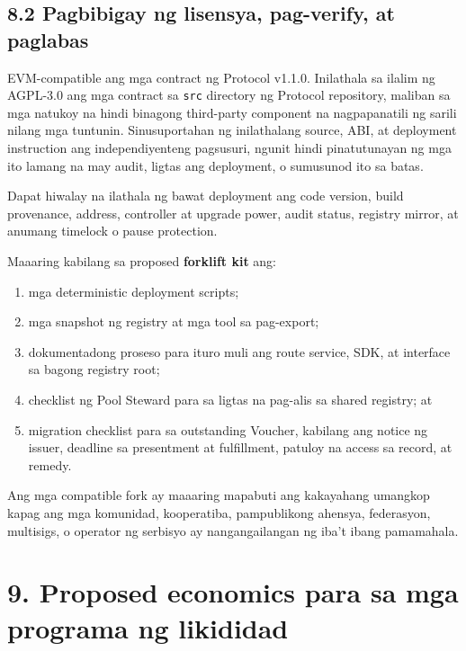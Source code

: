 \documentclass[11pt]{article}
\begin{document}
\subsection*{8.2 Pagbibigay ng lisensya, pag-verify, at paglabas}

EVM-compatible ang mga contract ng Protocol v1.1.0. Inilathala sa ilalim ng AGPL-3.0 ang mga contract sa \texttt{src} directory ng Protocol repository, maliban sa mga natukoy na hindi binagong third-party component na nagpapanatili ng sarili nilang mga tuntunin. Sinusuportahan ng inilathalang source, ABI, at deployment instruction ang independiyenteng pagsusuri, ngunit hindi pinatutunayan ng mga ito lamang na may audit, ligtas ang deployment, o sumusunod ito sa batas.

Dapat hiwalay na ilathala ng bawat deployment ang code version, build provenance, address, controller at upgrade power, audit status, registry mirror, at anumang timelock o pause protection.

Maaaring kabilang sa proposed \textbf{forklift kit} ang:

\begin{enumerate}[leftmargin=*]
\item mga deterministic deployment scripts;
\item mga snapshot ng registry at mga tool sa pag-export;
\item dokumentadong proseso para ituro muli ang route service, SDK, at interface sa bagong registry root;
\item checklist ng Pool Steward para sa ligtas na pag-alis sa shared registry; at
\item migration checklist para sa outstanding Voucher, kabilang ang notice ng issuer, deadline sa presentment at fulfillment, patuloy na access sa record, at remedy.
\end{enumerate}
Ang mga compatible fork ay maaaring mapabuti ang kakayahang umangkop kapag ang mga komunidad, kooperatiba, pampublikong ahensya, federasyon, multisigs, o operator ng serbisyo ay nangangailangan ng iba't ibang pamamahala.


\section*{9. Proposed economics para sa mga programa ng likididad}
\end{document}
